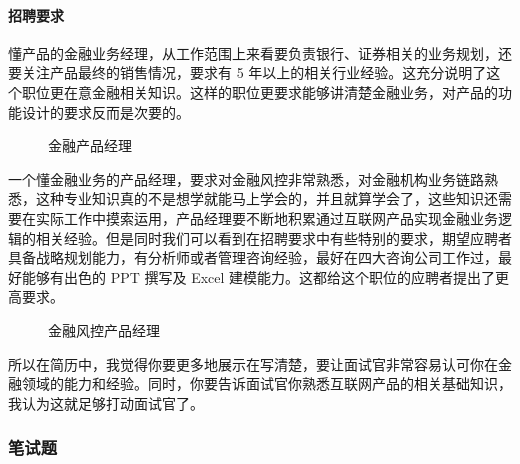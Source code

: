 \documentclass[letterpaper,11pt,english]{sphinxmanual}
\begin{document}
\paragraph{招聘要求}
\label{\detokenize{chapter_interview/AI_Finance_CV:id3}}
懂产品的金融业务经理，从工作范围上来看要负责银行、证券相关的业务规划，还要关注产品最终的销售情况，要求有
5
年以上的相关行业经验。这充分说明了这个职位更在意金融相关知识。这样的职位更要求能够讲清楚金融业务，对产品的功能设计的要求反而是次要的。

\begin{figure}[H]
\centering
\capstart

\noindent{}
\caption{金融产品经理}\label{\detokenize{chapter_interview/AI_Finance_CV:id4}}\end{figure}

一个懂金融业务的产品经理，要求对金融风控非常熟悉，对金融机构业务链路熟悉，这种专业知识真的不是想学就能马上学会的，并且就算学会了，这些知识还需要在实际工作中摸索运用，产品经理要不断地积累通过互联网产品实现金融业务逻辑的相关经验。但是同时我们可以看到在招聘要求中有些特别的要求，期望应聘者具备战略规划能力，有分析师或者管理咨询经验，最好在四大咨询公司工作过，最好能够有出色的
PPT 撰写及 Excel 建模能力。这都给这个职位的应聘者提出了更高要求。

\begin{figure}[H]
\centering
\capstart

\noindent{}
\caption{金融风控产品经理}\label{\detokenize{chapter_interview/AI_Finance_CV:id5}}\end{figure}

所以在简历中，我觉得你要更多地展示在写清楚，要让面试官非常容易认可你在金融领域的能力和经验。同时，你要告诉面试官你熟悉互联网产品的相关基础知识，我认为这就足够打动面试官了。


\subsubsection{笔试题}
\label{\detokenize{chapter_interview/exam:id1}}\label{\detokenize{chapter_interview/exam::doc}}
\end{document}
